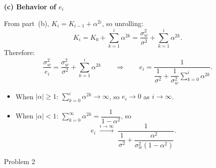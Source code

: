 \documentclass[12pt,a4paper,onecolumn]{exam}
\newcommand{\questionheader}[1]{%
  \begin{tcolorbox}[
    enhanced,
    colback=black,
    coltext=white,
    boxrule=0pt,
    fontupper=\Large\bfseries,
    arc=4mm
  ]
  #1
  \end{tcolorbox}%
}
\begin{document}
\begin{solution}
\textbf{(c) Behavior of $e_i$}

From part~(b), $K_i = K_{i-1} + \alpha^{2i}$, so unrolling:
\[
  K_i = K_0 + \sum_{k=1}^{i}\alpha^{2k}
      = \frac{\sigma_w^2}{\sigma^2} + \sum_{k=1}^{i}\alpha^{2k}.
\]
Therefore:
\[
  \frac{\sigma_w^2}{e_i} = \frac{\sigma_w^2}{\sigma^2} + \sum_{k=1}^{i}\alpha^{2k}
  \qquad\Rightarrow\qquad
  e_i = \frac{1}{\dfrac{1}{\sigma^2} + \dfrac{1}{\sigma_w^2}\displaystyle\sum_{k=0}^{i}\alpha^{2k}}.
\]
\begin{itemize}
  \item When $|\alpha| \geq 1$: $\sum_{k=0}^{i}\alpha^{2k} \to \infty$, so $e_i \to 0$ as $i\to\infty$.
  \item When $|\alpha| < 1$: $\sum_{k=0}^{\infty}\alpha^{2k} = \dfrac{1}{1-\alpha^2}$, so
    \[
      e_i \;\xrightarrow{i\to\infty}\; \frac{1}{\dfrac{1}{\sigma^2} + \dfrac{\alpha^2}{\sigma_w^2(1-\alpha^2)}}.
    \]
\end{itemize}

\end{solution}

\questionheader{Problem 2}
\end{document}
